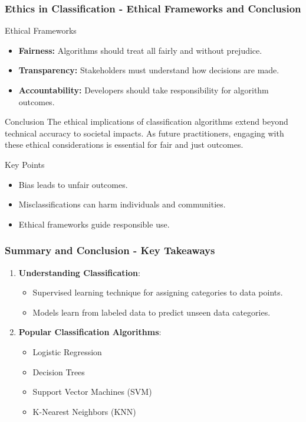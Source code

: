 \documentclass{beamer}
\begin{document}
\begin{frame}[fragile]
    \frametitle{Ethics in Classification - Ethical Frameworks and Conclusion}
    \begin{block}{Ethical Frameworks}
        \begin{itemize}
            \item \textbf{Fairness:} Algorithms should treat all fairly and without prejudice.
            \item \textbf{Transparency:} Stakeholders must understand how decisions are made.
            \item \textbf{Accountability:} Developers should take responsibility for algorithm outcomes.
        \end{itemize}
    \end{block}

    \begin{block}{Conclusion}
        The ethical implications of classification algorithms extend beyond technical accuracy to societal impacts. As future practitioners, engaging with these ethical considerations is essential for fair and just outcomes.
    \end{block}
    
    \begin{block}{Key Points}
        \begin{itemize}
            \item Bias leads to unfair outcomes.
            \item Misclassifications can harm individuals and communities.
            \item Ethical frameworks guide responsible use.
        \end{itemize}
    \end{block}
\end{frame}

\begin{frame}[fragile]
    \frametitle{Summary and Conclusion - Key Takeaways}
    \begin{enumerate}
        \item \textbf{Understanding Classification}:
        \begin{itemize}
            \item Supervised learning technique for assigning categories to data points.
            \item Models learn from labeled data to predict unseen data categories.
        \end{itemize}
        
        \item \textbf{Popular Classification Algorithms}:
        \begin{itemize}
            \item Logistic Regression
            \item Decision Trees
            \item Support Vector Machines (SVM)
            \item K-Nearest Neighbors (KNN)
        \end{itemize}
    \end{enumerate}
\end{frame}
\end{document}
